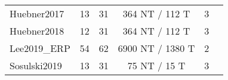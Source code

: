 \documentclass[twocolumn]{article}
\begin{document}
\begin{table}[h]
\begin{tabular}{@{}lrrcrl@{}}
		Huebner2017    & 13                         & 31          & 364 NT / 112 T           & 3                          &                                          \\
		Huebner2018    & 12                         & 31          & 364 NT / 112 T           & 3                          &                                          \\
		Lee2019\_ERP   & 54                         & 62          & 6900 NT / 1380 T         & 2                          &                                          \\
		Sosulski2019   & 13                         & 31          & 75 NT / 15 T             & 3                          &                                          \\ \bottomrule
	\end{tabular}
\end{table}
\end{document}
